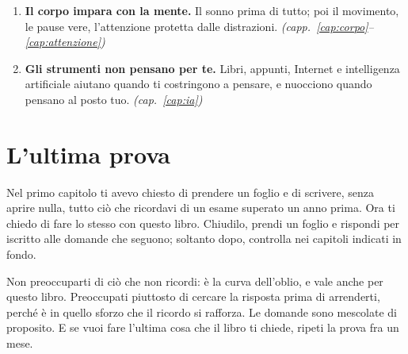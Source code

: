 \begin{enumerate}[leftmargin=1.8em, itemsep=0.35\baselineskip]
        personale, e il valore che vedi in ciò che studi, sostengono la
        fatica che imparare richiede.
        {\footnotesize\itshape (capp.~\ref{cap:sapere} e~\ref{cap:motivazione})}
  \item \textbf{Il corpo impara con la mente.} Il sonno prima di tutto;
        poi il movimento, le pause vere, l'attenzione protetta dalle
        distrazioni.
        {\footnotesize\itshape (capp.~\ref{cap:corpo}--\ref{cap:attenzione})}
  \item \textbf{Gli strumenti non pensano per te.} Libri, appunti,
        Internet e intelligenza artificiale aiutano quando ti
        costringono a pensare, e nuocciono quando pensano al posto tuo.
        {\footnotesize\itshape (cap.~\ref{cap:ia})}
\end{enumerate}

\section*{L'ultima prova}

Nel primo capitolo ti avevo chiesto di prendere un foglio e di
scrivere, senza aprire nulla, tutto ciò che ricordavi di un esame
superato un anno prima. Ora ti chiedo di fare lo stesso con questo
libro. Chiudilo, prendi un foglio e rispondi per iscritto alle domande
che seguono; soltanto dopo, controlla nei capitoli indicati in fondo.

Non preoccuparti di ciò che non ricordi: è la curva dell'oblio, e vale
anche per questo libro. Preoccupati piuttosto di cercare la risposta
prima di arrenderti, perché è in quello sforzo che il ricordo si
rafforza. Le domande sono mescolate di proposito. E se vuoi fare
l'ultima cosa che il libro ti chiede, ripeti la prova fra un mese.

